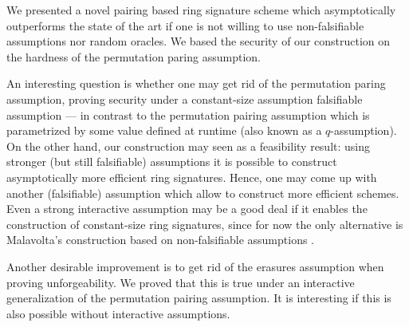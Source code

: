 
We presented a novel pairing based ring signature scheme which asymptotically outperforms the state of the art if one is not willing to use non-falsifiable assumptions nor random oracles. We based the security of our construction on the hardness of the permutation paring assumption.

An interesting question is whether one may get rid of the permutation paring assumption, proving security under a constant-size assumption falsifiable assumption --- in contrast to the permutation pairing assumption which is parame\-tri\-zed by some value defined at runtime (also known as a $q$-assumption). On the other hand, our construction may seen as a feasibility result: using stronger (but still falsifiable) assumptions it is possible to construct asymptotically more efficient ring signatures. Hence, one may come up with another (falsifiable) assumption which allow to construct more efficient schemes. Even a strong interactive assumption may be a good deal if it enables the construction of constant-size ring signatures, since for now the only alternative is Malavolta's construction based on non-falsifiable assumptions \cite{AC:MalSch17}.

Another desirable improvement is to get rid of the erasures assumption when proving unforgeability. We proved that this is true under an interactive generalization of the permutation pairing assumption. It is interesting if this is also possible without interactive assumptions. 